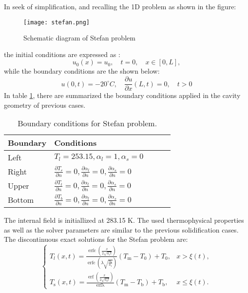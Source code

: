 \setlength{\parindent}{0.5cm} In seek of simplification, and recalling the 1D problem as shown in the figure:
\begin{figure}[h!]
	\centering
	\texttt{[image: stefan.png]}	
	\label{Stefanfig}
	\caption{Schematic diagram of Stefan problem}
\end{figure} 
\newline
the initial conditions are expressed as \cite{zhao_zhao_xu_2018}:
\begin{equation}
	u_{0}(x)=u_{0}, \quad t=0, \quad x \in[0, L],
	\label{3.45}
\end{equation}
while the boundary conditions are the shown below:
\begin{equation}
	u(0, t)=-20^{\circ}C, \quad \frac{\partial u}{\partial x}(L, t)=0, \quad t>0
	\label{3.46}
\end{equation}
In table \ref{3.19tab}, there are summarized the boundary conditions applied in the cavity geometry of previous cases.
\begin{table}[h!]
	\begin{tabular}{@{}lllll@{}}
		\toprule[1pt]
		\textbf{Boundary} & \textbf{Conditions}  \\ \midrule[2pt]
		Left & $ T_{l} = 253.15, \alpha_{l} = 1, \alpha_{s} = 0    $  \\
		Right & $\frac{\partial T_{r}}{\partial n} = 0,  \frac{\partial \alpha_{l}}{\partial n} = 0, \frac{\partial \alpha_{s}}{\partial n} = 0  $ \\
		Upper & $\frac{\partial T_{t}}{\partial n} = 0, \frac{\partial \alpha_{l}}{\partial n} = 0, \frac{\partial \alpha_{s}}{\partial n} = 0$  \\
		Bottom & $\frac{\partial T_{b}}{\partial n} = 0, \frac{\partial \alpha_{l}}{\partial n} = 0, \frac{\partial \alpha_{s}}{\partial n} = 0 $  \\ \bottomrule[1pt]		
	\end{tabular}
	\centering
	\caption{Boundary conditions for Stefan problem.}	
	\label{3.19tab}
\end{table}
The internal field is initiallized at 283.15 K. The used thermophysical properties as well as the solver parameters are similar to the previous solidification cases.
\newline
The discontinuous exact solutions for the Stefan problem are:
\begin{equation}
	\begin{cases}T_{l}(x, t)=\frac{\operatorname{erfc}\left(\frac{x}{2 \sqrt{a_{1} t}}\right)}{\operatorname{erfc}\left(\lambda \sqrt{\frac{a_{\mathrm{s}}}{a_{1}}}\right)}\left(T_{\mathrm{m}}-T_{0}\right)+T_{0}, & x>\xi(t), \\ 
	T_{\mathrm{s}}(x, t)=\frac{\operatorname{erf}\left(\frac{x}{2 \sqrt{a_{\mathrm{s}} t}}\right)}{\operatorname{erf \lambda }}\left(T_{\mathrm{m}}-T_{\mathrm{b}}\right)+T_{\mathrm{b}},& x \leq \xi(t)  .\end{cases}
	\label{3.47}
\end{equation}
